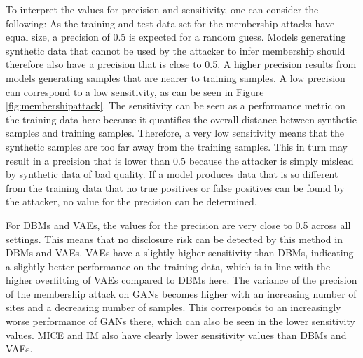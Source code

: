 \documentclass[12pt]{article}
\begin{document}
To interpret the values for precision and sensitivity, one can consider the following:
As the training and test data set for the membership attacks have equal size, a precision of 0.5 is expected for a random guess.
Models generating synthetic data that cannot be used by the attacker to infer membership should therefore also have a precision that is close to 0.5.
A higher precision results from models generating samples that are nearer to training samples.
A low precision can correspond to a low sensitivity, as can be seen in Figure \ref{fig:membershipattack}.
The sensitivity can be seen as a performance metric on the training data here because it quantifies the overall distance between synthetic samples and training samples.
Therefore, a very low sensitivity means that the synthetic samples are too far away from the training samples.
This in turn may result in a precision that is lower than 0.5 because the attacker is simply mislead by synthetic data of bad quality.
If a model produces data that is so different from the training data that no true positives or false positives can be found by the attacker, no value for the precision can be determined.

For DBMs and VAEs, the values for the precision are very close to 0.5 across all settings.
This means that no disclosure risk can be detected by this method in DBMs and VAEs.
VAEs have a slightly higher sensitivity than DBMs, indicating a slightly better performance on the training data, which is in line with the higher overfitting of VAEs compared to DBMs here.
The variance of the precision of the membership attack on GANs becomes higher with an  increasing number of sites and a decreasing number of samples.
This corresponds to an increasingly worse performance of GANs there, which can also be seen in the lower sensitivity values.
MICE and IM also have clearly lower sensitivity values than DBMs and VAEs.
\end{document}

